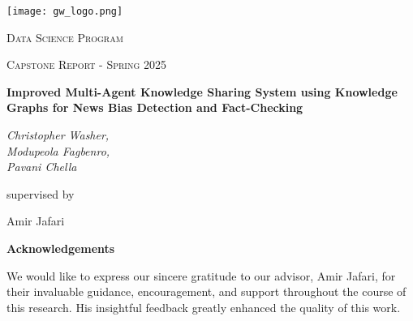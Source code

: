 \documentclass{scrartcl}
\begin{document}
\begin{titlepage}
	\centering
	\texttt{[image: gw\_logo.png]}\par
	\vspace{2cm}
	{\scshape\LARGE Data Science Program \par}
	\vspace{1cm}
	{\scshape\Large Capstone Report - Spring 2025\par}
	\vspace{1.5cm}
	{\huge\bfseries Improved Multi-Agent Knowledge Sharing System using Knowledge Graphs for News Bias Detection and Fact-Checking
\par}
	\vspace{2cm}
	{\Large\itshape Christopher Washer,\\ Modupeola Fagbenro,\\ Pavani Chella\\}\par
	\vspace{1.5cm}
	supervised by\par
	Amir Jafari

\end{titlepage}

\clearpage  %

\textbf{{Acknowledgements}}

We would like to express our sincere gratitude to our advisor, Amir Jafari, for their invaluable guidance, encouragement, and support throughout the course of this research. His insightful feedback greatly enhanced the quality of this work.
\end{document}
